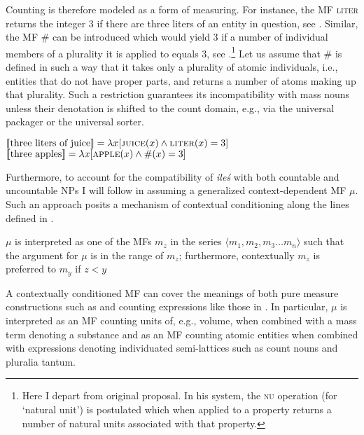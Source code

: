 \documentclass[output=paper,
]{langscibook}
\begin{document}
	\noindent Counting is therefore modeled as a form of measuring. For instance, the MF \textsc{liter} returns the integer 3 if there are three liters of an entity in question, see . Similar, the MF \# can be introduced which would yield 3 if a number of individual members of a plurality it is applied to equals 3, see .\footnote{Here I depart from  original proposal. In his system, the \textsc{nu} operation (for `natural unit') is postulated which when applied to a property returns a number of natural units associated with that property.} Let us assume that \# is defined in such a way that it takes only a plurality of atomic individuals, i.e., entities that do not have proper parts, and returns a number of atoms making up that plurality. Such a restriction guarantees its incompatibility with mass nouns unless their denotation is shifted to the count domain, e.g., via the universal packager or the universal sorter. 
	
	\ea \ea $\llbracket\text{three liters of juice}\rrbracket=\lambda x[\textsc{juice}(x) \wedge \textsc{liter}(x)=3]$\label{ex:mf-liter}
	\ex $\llbracket\text{three apples}\rrbracket=\lambda x[\textsc{apple}(x) \wedge \#(x)=3]$\label{ex:mf-cardinality}
	\z
    \z
	
	\noindent Furthermore, to account for the compatibility of \textit{ileś} with both countable and uncountable NPs I will follow \cite{bale_barner2009interpretation} in assuming a generalized context-dependent MF $\mu$. Such an approach posits a mechanism of contextual conditioning along the lines defined in .

    \ea $\mu$ is interpreted as one of the MFs $m_z$ in the series $\langle m_1, m_2, m_3\dots m_n\rangle$ such that the argument for $\mu$ is in the range of $m_z$; furthermore, contextually $m_z$ is preferred to $m_y$ if $z<y$\label{ex:contextual-conditioning-mf}
    \z


    
    \noindent A contextually conditioned MF can cover the meanings of both pure measure constructions such as  and counting expressions like those in . In particular, $\mu$ is interpreted as an MF counting units of, e.g., volume, when combined with a mass term denoting a substance and as an MF counting atomic entities when combined with expressions denoting individuated semi-lattices such as count nouns and pluralia tantum.
    
\end{document}

